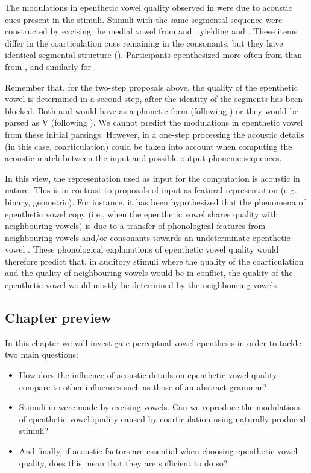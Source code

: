 The modulations in epenthetic vowel quality observed in \cite{dupoux2011} were due to acoustic cues present in the stimuli. Stimuli with the same segmental sequence were constructed by excising the medial vowel from  and , yielding  and . These items differ in the coarticulation cues remaining in the consonants, but they have identical segmental structure (). Participants epenthesized  more often from  than from , and similarly for .

Remember that, for the two-step proposals above, the quality of the epenthetic vowel is determined in a second step, after the identity of the segments has been blocked. Both  and  would have  as a phonetic form (following \cite{berent2007}) or they would be parsed as V (following \cite{monahan2009}). We cannot predict the modulations in epenthetic vowel from these initial parsings. However, in a one-step processing the acoustic details (in this case, coarticulation) could be taken into account when computing the acoustic match between the input and possible output phoneme sequences. 

In this view, the representation used as input for the computation is acoustic in nature. This is in contrast to proposals of input as featural representation (e.g., binary, geometric). For instance, it has been hypothesized that the phenomena of epenthetic vowel copy (i.e., when the epenthetic vowel shares quality with neighbouring vowels) is due to a transfer of phonological features from neighbouring vowels and/or consonants towards an undeterminate epenthetic vowel \cite{rose2006, uffmann2006}. These phonological explanations of epenthetic vowel quality would therefore predict that, in auditory stimuli where the quality of the coarticulation and the quality of neighbouring vowels would be in conflict, the quality of the epenthetic vowel would mostly be determined by the neighbouring vowels.      

\subsection{Chapter preview}

In this chapter we will investigate perceptual vowel epenthesis in order to tackle two main questions: 

\begin{itemize}
\item How does the influence of acoustic details on epenthetic vowel quality compare to other influences such as those of an abstract grammar?
\item Stimuli in \cite{dupoux2011} were made by excising vowels. Can we reproduce the modulations of epenthetic vowel quality caused by coarticulation using naturally produced stimuli?
\item And finally, if acoustic factors are essential when choosing epenthetic vowel quality, does this mean that they are sufficient to do so?
\end{itemize}

